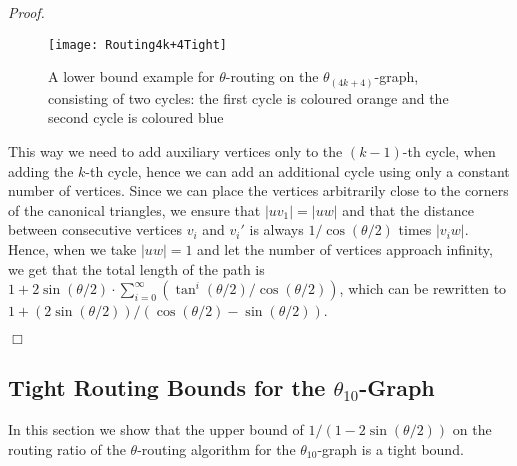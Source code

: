 \documentclass[12pt]{article}
\newenvironment{proof}{\emph{Proof.}}{\hfill $\Box$\\}
\newcommand{\graph}[1]{\ensuremath{\theta_{(4 k + #1)}}-graph\xspace}
\begin{document}
\begin{proof}
  \begin{figure}[ht]
    \centering
    \texttt{[image: Routing4k+4Tight]}
    \caption{A lower bound example for $\theta$-routing on the \graph{4}, consisting of two cycles: the first cycle is coloured orange and the second cycle is coloured blue}
    \label{fig:Routing4k+4Tight}
  \end{figure}

  This way we need to add auxiliary vertices only to the $(k-1)$-th cycle, when adding the $k$-th cycle, hence we can add an additional cycle using only a constant number of vertices. Since we can place the vertices arbitrarily close to the corners of the canonical triangles, we ensure that $|u v_1| = |u w|$ and that the distance between consecutive vertices $v_i$ and $v_i'$ is always $1 / \cos (\theta/2)$ times $|v_i w|$. Hence, when we take $|u w| = 1$ and let the number of vertices approach infinity, we get that the total length of the path is $1 + 2 \sin (\theta/2) \cdot \sum_{i=0}^\infty (\tan^i (\theta/2) / \cos (\theta/2))$, which can be rewritten to $1 + (2 \sin (\theta/2)) / (\cos (\theta/2) - \sin (\theta/2))$.

\end{proof}


\subsection{Tight Routing Bounds for the $\theta_{10}$-Graph}
In this section we show that the upper bound of $1/(1 - 2 \sin (\theta/2))$ on the routing ratio of the $\theta$-routing algorithm for the $\theta_{10}$-graph is a tight bound. 
\end{document}
